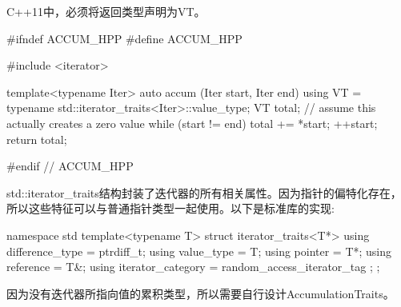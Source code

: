 \begin{notice}
C++11中，必须将返回类型声明为VT。
\end{notice}

\begin{cpp}
#ifndef ACCUM_HPP
#define ACCUM_HPP

#include <iterator>

template<typename Iter>
auto accum (Iter start, Iter end)
{
	using VT = typename std::iterator_traits<Iter>::value_type;
	VT total{}; // assume this actually creates a zero value
	while (start != end) {
		total += *start;
		++start;
	}
	return total;
}

#endif // ACCUM_HPP
\end{cpp}

std::iterator\_traits结构封装了迭代器的所有相关属性。因为指针的偏特化存在，所以这些特征可以与普通指针类型一起使用。以下是标准库的实现:

\begin{cpp}
namespace std {
	template<typename T>
	struct iterator_traits<T*> {
		using difference_type = ptrdiff_t;
		using value_type = T;
		using pointer = T*;
		using reference = T&;
		using iterator_category = random_access_iterator_tag ;
	};
}
\end{cpp}

因为没有迭代器所指向值的累积类型，所以需要自行设计AccumulationTraits。









